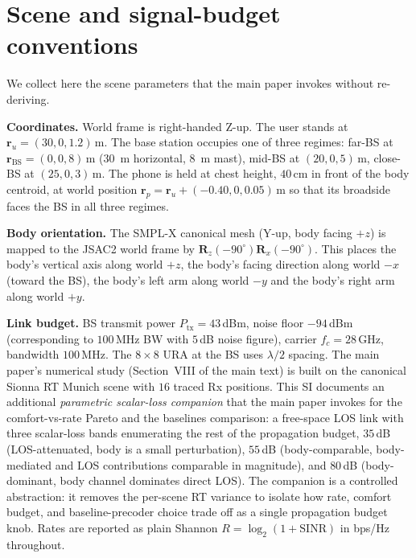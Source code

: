 \documentclass[10pt,journal,twocolumn]{IEEEtran}
\theoremstyle{plain}
\theoremstyle{definition}
\begin{document}
\section{Scene and signal-budget conventions}\label{si:scene}

We collect here the scene parameters that the main paper invokes
without re-deriving.

\textbf{Coordinates.} World frame is right-handed Z-up. The user
stands at $\bm{r}_u = (30, 0, 1.2)\,$m. The base station occupies
one of three regimes: far-BS at $\bm{r}_\mathrm{BS} = (0, 0, 8)\,$m
(30~m horizontal, 8~m mast), mid-BS at $(20, 0, 5)\,$m, close-BS
at $(25, 0, 3)\,$m. The phone is held at chest height,
$40\,$cm in front of the body centroid, at world position
$\bm{r}_p = \bm{r}_u + (-0.40, 0, 0.05)\,$m so that its broadside
faces the BS in all three regimes.

\textbf{Body orientation.} The SMPL-X canonical mesh
(Y-up, body facing $+z$) is mapped to the JSAC2 world frame by
$\mathbf{R}_z(-90^{\circ}) \mathbf{R}_x(-90^{\circ})$. This places
the body's vertical axis along world $+z$, the body's facing
direction along world $-x$ (toward the BS), the body's left arm
along world $-y$ and the body's right arm along world $+y$.

\textbf{Link budget.} BS transmit power $P_\mathrm{tx} = 43\,$dBm,
noise floor $-94\,$dBm (corresponding to $100\,$MHz BW with $5\,$dB
noise figure), carrier $f_c = 28\,$GHz, bandwidth $100\,$MHz. The
$8 \times 8$ URA at the BS uses $\lambda/2$ spacing. The main paper's
numerical study (Section~VIII of the main text) is built on
the canonical Sionna RT Munich scene with $16$ traced Rx positions.
This SI documents an additional \emph{parametric scalar-loss
companion} that the main paper invokes for the comfort-vs-rate Pareto
and the baselines comparison: a free-space LOS link with three
scalar-loss bands enumerating the rest of the propagation budget,
$35\,$dB (LOS-attenuated, body is a small perturbation),
$55\,$dB (body-comparable, body-mediated and LOS contributions
comparable in magnitude), and $80\,$dB (body-dominant, body channel
dominates direct LOS). The companion is a controlled abstraction:
it removes the per-scene RT variance to isolate how rate, comfort
budget, and baseline-precoder choice trade off as a single propagation
budget knob. Rates are reported as plain Shannon
$R = \log_2(1 + \mathrm{SINR})$ in bps/Hz throughout.
\end{document}
